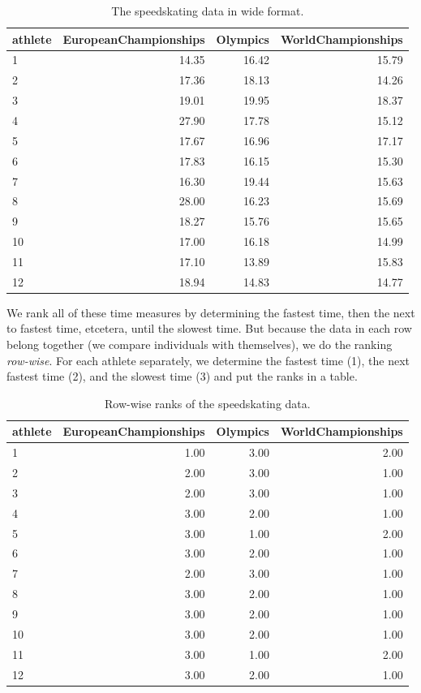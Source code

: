 \documentclass[]{book}\usepackage[]{graphicx}\usepackage[]{color}
\begin{document}
\begin{table}[ht]
\centering
\caption{The speedskating data in wide format.} 
\label{tab:nonparmixed_4}
\begin{tabular}{lrrr}
  \hline
athlete & EuropeanChampionships & Olympics & WorldChampionships \\ 
  \hline
1 & 14.35 & 16.42 & 15.79 \\ 
  2 & 17.36 & 18.13 & 14.26 \\ 
  3 & 19.01 & 19.95 & 18.37 \\ 
  4 & 27.90 & 17.78 & 15.12 \\ 
  5 & 17.67 & 16.96 & 17.17 \\ 
  6 & 17.83 & 16.15 & 15.30 \\ 
  7 & 16.30 & 19.44 & 15.63 \\ 
  8 & 28.00 & 16.23 & 15.69 \\ 
  9 & 18.27 & 15.76 & 15.65 \\ 
  10 & 17.00 & 16.18 & 14.99 \\ 
  11 & 17.10 & 13.89 & 15.83 \\ 
  12 & 18.94 & 14.83 & 14.77 \\ 
   \hline
\end{tabular}
\end{table}


We rank all of these time measures by determining the fastest time, then the next to fastest time, etcetera, until the slowest time. But because the data in each row belong together (we compare individuals with themselves), we do the ranking \textit{row-wise}. For each athlete separately, we determine the fastest time (1), the next fastest time (2), and the slowest time (3) and put the ranks in a table.


\begin{table}[ht]
\centering
\caption{Row-wise ranks of the speedskating data.} 
\label{tab:nonparmixed_5}
\begin{tabular}{lrrr}
  \hline
athlete & EuropeanChampionships & Olympics & WorldChampionships \\ 
  \hline
1 & 1.00 & 3.00 & 2.00 \\ 
  2 & 2.00 & 3.00 & 1.00 \\ 
  3 & 2.00 & 3.00 & 1.00 \\ 
  4 & 3.00 & 2.00 & 1.00 \\ 
  5 & 3.00 & 1.00 & 2.00 \\ 
  6 & 3.00 & 2.00 & 1.00 \\ 
  7 & 2.00 & 3.00 & 1.00 \\ 
  8 & 3.00 & 2.00 & 1.00 \\ 
  9 & 3.00 & 2.00 & 1.00 \\ 
  10 & 3.00 & 2.00 & 1.00 \\ 
  11 & 3.00 & 1.00 & 2.00 \\ 
  12 & 3.00 & 2.00 & 1.00 \\ 
   \hline
\end{tabular}
\end{table}
\end{document}

